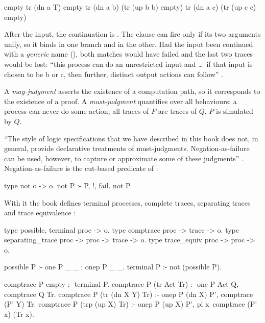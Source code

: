 {{\begin{lprolog}
empty
tr (dn a T) empty
tr (dn a b) (tr (up b b) empty)
tr (dn a c) (tr (up c c) empty)
\end{lprolog}
\noindent After the input, the continuation is .
The clause  can fire only if its two arguments unify, so it binds 
in one branch and  in the other. Had the input been continued with a \emph{generic} name
(), both matches would have failed and the last two traces would be lost: ``this process can do
an unrestricted input and \ldots\ if that input is chosen to be b or c, then further, distinct output
actions can follow'' .

\begin{definition}
A \emph{may-judgment} asserts the existence of a computation path, so it corresponds to the existence of a
proof. A \emph{must-judgment} quantifies over all behaviours: a process can never do some action, all
traces of $P$ are traces of $Q$, $P$ is simulated by $Q$.
\end{definition}

\noindent ``The style of logic specifications that we have described in this book does not, in general,
provide declarative treatments of must-judgments. Negation-as-failure can be used, however, to capture or
approximate some of these judgments'' . Negation-as-failure is the cut-based predicate of
:
\begin{lprolog}
type not  o -> o.
not P :- P, !, fail.
not P.
\end{lprolog}
\noindent With it the book defines terminal processes, complete traces, separating traces and trace
equivalence :
\begin{lprolog}
type possible, terminal  proc -> o.
type comptrace           proc -> trace -> o.
type separating_trace    proc -> proc -> trace -> o.
type trace_equiv         proc -> proc -> o.

possible P :- one P _ _ ; onep P _ _.
terminal P :- not (possible P).

comptrace P empty :- terminal P.
comptrace P (tr Act Tr)      :- one P Act Q, comptrace Q Tr.
comptrace P (tr (dn X Y) Tr) :- onep P (dn X) P',
                                comptrace (P' Y) Tr.
comptrace P (trp (up X) Tr)  :- onep P (up X) P',
                                pi x\ comptrace (P' x) (Tr x).


\end{lprolog}}}

